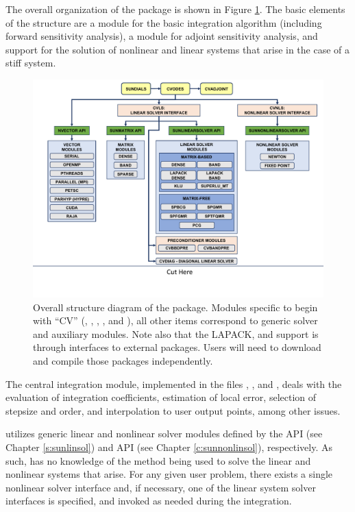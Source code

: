 The overall organization of the {\cvodes} package is shown in Figure
\ref{f:cvsorg}.
The basic elements of the structure are a module for
the basic integration algorithm (including forward sensitivity analysis),
a module for adjoint sensitivity analysis, and support for the solution
of nonlinear and linear systems that arise in the case of a stiff system.  
\begin{figure}[!ht]
{\centerline{\includegraphics[width=\textwidth]{cvsorg}}}
\caption [Overall structure diagram of the {\cvodes} package]
{Overall structure diagram of the {\cvodes} package.
  Modules specific to {\cvodes} begin with ``CV'' ({\cvls}, {\cvdiag},
  {\cvbbdpre}, {\cvbandpre}, and {\cvnls}), all other items correspond
  to generic solver and auxiliary modules. 
  Note also that the LAPACK, {\klu} and {\superlumt} support is
  through interfaces to external packages.  Users will need to
  download and compile those packages independently.}
\label{f:cvsorg}
\end{figure}
The central integration module, implemented in the files ,
, and , deals with the evaluation of integration
coefficients, estimation of local
error, selection of stepsize and order, and interpolation to user output
points, among other issues.

{\cvodes} utilizes generic linear and nonlinear solver modules defined by the
{\sunlinsol} API (see Chapter \ref{s:sunlinsol}) and {\sunnonlinsol} API (see
Chapter \ref{c:sunnonlinsol}), respectively. As such, {\cvodes} has no knowledge
of the method being used to solve the linear and nonlinear systems that
arise. For any given user problem, there exists a single nonlinear solver
interface and, if necessary, one of the linear system solver interfaces is
specified, and invoked as needed during the integration.

